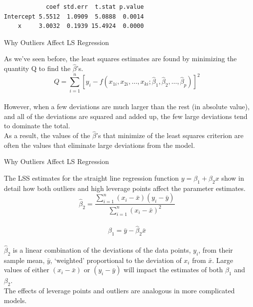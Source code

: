 {{{\begin{verbatim}
            coef std.err  t.stat p.value 
Intercept 5.5512  1.0909  5.0888  0.0014
    x     3.0032  0.1939 15.4924  0.0000
\end{verbatim}
}
\newpage
\begin{center}
Why Outliers Affect LS Regression
\end{center}
\vspace{0.5in}
As we've seen before, the least squares estimates are found by minimizing
the quantity Q to find the $\hat{\beta}$'s. \\
\vspace{0.35in}
\[
Q=\sum_{i=1}^{n}[y_i-f(x_{1i},x_{2i},\ldots,x_{ki};\hat{\beta}_1,\hat{\beta}_2,\ldots,\hat{\beta}_p)]^2
\] \\
\vspace{0.5in}
However, when a few deviations are much larger than the rest (in absolute value), and
all of the deviations are squared and added up, the few large deviations
tend to dominate the total. \\ 
\vspace{0.5in}
As a result, the values of the $\hat{\beta}$'s that minimize of the least squares 
criterion are often the values that eliminate large deviations from the model. 
\newpage
\begin{center}
Why Outliers Affect LS Regression
\end{center}
\vspace{0.5in}
The LSS estimates for the straight line regression function 
$y = \beta_1 + \beta_2x$ 
show in detail how both outliers and high leverage points 
affect the parameter estimates. \\ 
\vspace{0.15in}
\[ \hat{\beta}_2=\frac{\sum_{i=1}^{n}(x_i-\bar{x})(y_i-\bar{y})}{\sum_{i=1}^{n}(x_i-\bar{x})^2} \] \\
\vspace{0.15in}
\[ \hat{\beta}_1=\bar{y} - \hat{\beta}_2\bar{x} \] \\
\vspace{0.5in}
$\hat{\beta}_2$ is a linear combination of the deviations of the
data points, $y_i$, from their sample mean, $\bar{y}$, `weighted' proportional to the
deviation of $x_i$ from $\bar{x}$.  Large values of either $(x_i-\bar{x})$ or 
$(y_i-\bar{y})$ will impact the estimates of both $\beta_1$ and $\beta_2$. \\
\vspace{0.5in}
The effects of leverage points and outliers are analogous in more complicated models.
\newpage
\begin{center}

\end{center}}}
